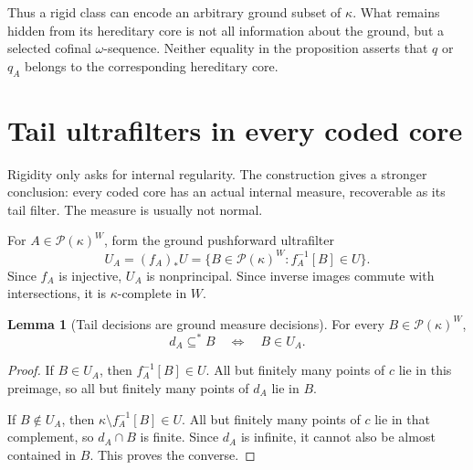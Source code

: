 \documentclass[11pt,letterpaper]{article}
\theoremstyle{definition}
\newtheorem{lemma}[definition]{Lemma}
\numberwithin{equation}{section}
\newcommand{\Pow}{\mathcal P}
\begin{document}
Thus a rigid class can encode an arbitrary ground subset of $\kappa$. What remains hidden from its hereditary core is not all information about the ground, but a selected cofinal $\omega$-sequence. Neither equality in the proposition asserts that $q$ or $q_A$ belongs to the corresponding hereditary core.

\section{Tail ultrafilters in every coded core}\label{sec:measures}

Rigidity only asks for internal regularity. The construction gives a stronger conclusion: every coded core has an actual internal measure, recoverable as its tail filter. The measure is usually not normal.

For $A\in\Pow(\kappa)^W$, form the ground pushforward ultrafilter
\begin{equation}\label{eq:pushforward}
U_A=(f_A)_*U
   =\{B\in\Pow(\kappa)^W:f_A^{-1}[B]\in U\}.
\end{equation}
Since $f_A$ is injective, $U_A$ is nonprincipal. Since inverse images commute with intersections, it is $\kappa$-complete in $W$.

\begin{lemma}[Tail decisions are ground measure decisions]\label{lem:taildecisions}
For every $B\in\Pow(\kappa)^W$,
\begin{equation}\label{eq:taildecision}
d_A\subseteq^*B\quad\Longleftrightarrow\quad B\in U_A.
\end{equation}
\end{lemma}
\begin{proof}
If $B\in U_A$, then $f_A^{-1}[B]\in U$. All but finitely many points of $c$ lie in this preimage, so all but finitely many points of $d_A$ lie in $B$.

If $B\notin U_A$, then $\kappa\setminus f_A^{-1}[B]\in U$. All but finitely many points of $c$ lie in that complement, so $d_A\cap B$ is finite. Since $d_A$ is infinite, it cannot also be almost contained in $B$. This proves the converse.
\end{proof}
\end{document}
